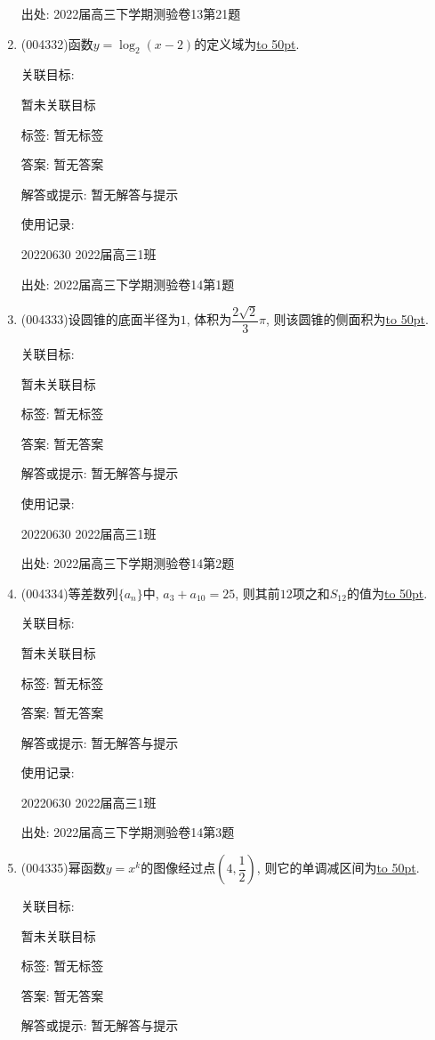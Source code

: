\documentclass[10pt,a4paper]{article}
\newcommand{\blank}[1]{\underline{\hbox to #1pt{}}}
\begin{document}
\begin{enumerate}[1.]
出处: 2022届高三下学期测验卷13第21题
\item { (004332)}函数$y=\log_2(x-2)$的定义域为\blank{50}.


关联目标:

暂未关联目标



标签: 暂无标签

答案: 暂无答案

解答或提示: 暂无解答与提示

使用记录:

20220630	2022届高三1班	


出处: 2022届高三下学期测验卷14第1题
\item { (004333)}设圆锥的底面半径为$1$, 体积为$\dfrac{2\sqrt 2}3\pi$, 则该圆锥的侧面积为\blank{50}.


关联目标:

暂未关联目标



标签: 暂无标签

答案: 暂无答案

解答或提示: 暂无解答与提示

使用记录:

20220630	2022届高三1班	


出处: 2022届高三下学期测验卷14第2题
\item { (004334)}等差数列$\{a_n\}$中, $a_3+a_{10}=25$, 则其前$12$项之和$S_{12}$的值为\blank{50}.


关联目标:

暂未关联目标



标签: 暂无标签

答案: 暂无答案

解答或提示: 暂无解答与提示

使用记录:

20220630	2022届高三1班	


出处: 2022届高三下学期测验卷14第3题
\item { (004335)}幂函数$y=x^k$的图像经过点$(4,\dfrac 12)$, 则它的单调减区间为\blank{50}.


关联目标:

暂未关联目标



标签: 暂无标签

答案: 暂无答案

解答或提示: 暂无解答与提示


\end{enumerate}
\end{document}

